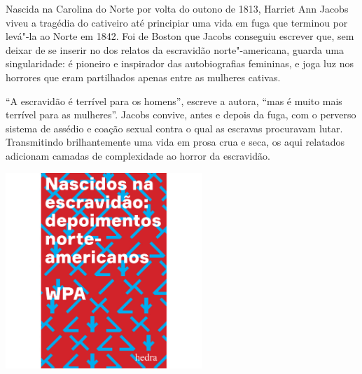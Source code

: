\medskip

\noindent{}Nascida na Carolina do Norte por volta do outono de 1813, Harriet Ann Jacobs viveu a tragédia do cativeiro até principiar uma vida em fuga que terminou por levá"-la ao Norte em 1842. Foi de Boston que Jacobs conseguiu escrever {} que, sem deixar de se inserir no {} dos relatos da escravidão norte"-americana, guarda uma singularidade: é pioneiro e inspirador das autobiografias femininas, e joga luz nos horrores que eram partilhados apenas entre as mulheres cativas.

“A escravidão é terrível para os homens”, escreve a autora, “mas é muito mais terrível para as mulheres”. Jacobs convive, antes e depois da fuga, com o perverso sistema de assédio e coação sexual contra o qual as escravas procuravam lutar. Transmitindo brilhantemente uma vida em prosa crua e seca, os {} aqui relatados adicionam camadas de complexidade ao horror da escravidão.


\vfill

\hspace*{-.4cm}\begin{minipage}[c]{.5\linewidth}
\small{
{}}
\end{minipage}


\pagebreak

\begin{center}
\hspace*{-3.6cm}
\hspace*{3.1cm}\includegraphics[width=74mm]{./grid/wpa.jpg}
\end{center}

